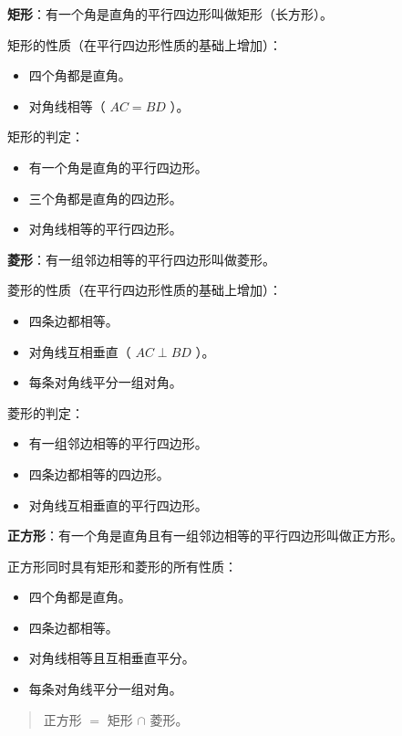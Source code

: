\begin{understand}


\textbf{矩形}：有一个角是直角的平行四边形叫做矩形（长方形）。

矩形的性质（在平行四边形性质的基础上增加）：
\begin{itemize}
  \item 四个角都是直角。
  \item 对角线相等（ $AC = BD$ ）。
\end{itemize}


矩形的判定：
\begin{itemize}
  \item 有一个角是直角的平行四边形。
  \item 三个角都是直角的四边形。
  \item 对角线相等的平行四边形。
\end{itemize}


\textbf{菱形}：有一组邻边相等的平行四边形叫做菱形。

菱形的性质（在平行四边形性质的基础上增加）：
\begin{itemize}
  \item 四条边都相等。
  \item 对角线互相垂直（ $AC \perp BD$ ）。
  \item 每条对角线平分一组对角。
\end{itemize}


菱形的判定：
\begin{itemize}
  \item 有一组邻边相等的平行四边形。
  \item 四条边都相等的四边形。
  \item 对角线互相垂直的平行四边形。
\end{itemize}


\textbf{正方形}：有一个角是直角且有一组邻边相等的平行四边形叫做正方形。

正方形同时具有矩形和菱形的所有性质：
\begin{itemize}
  \item 四个角都是直角。
  \item 四条边都相等。
  \item 对角线相等且互相垂直平分。
  \item 每条对角线平分一组对角。
\end{itemize}


\end{understand}

\begin{quote}
正方形 $=$ 矩形 $\cap$ 菱形。
\end{quote}



